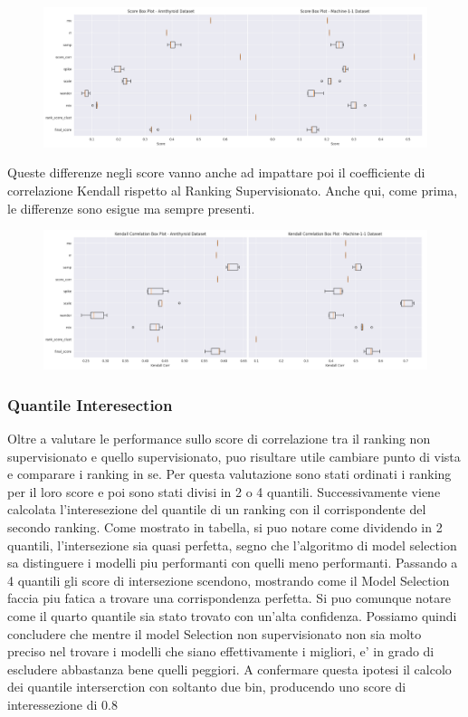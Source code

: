 \begin{figure}[t]
\includegraphics[width=14cm, scale=1]{images/score_box}
\centering
\end{figure}

Queste differenze negli score vanno anche ad impattare poi il coefficiente di correlazione Kendall rispetto al Ranking Supervisionato. Anche qui, come prima, le differenze sono esigue ma sempre presenti.

\begin{figure}[t]
\includegraphics[width=14cm, scale=1]{images/kendall_box}
\centering
\end{figure}


\subsubsection{Quantile Interesection}
Oltre a valutare le performance sullo score di correlazione tra il ranking non supervisionato e quello supervisionato, puo risultare utile cambiare punto di vista e comparare i ranking in se.
Per questa valutazione sono stati ordinati i ranking per il loro score e poi sono stati divisi in 2 o 4 quantili. Successivamente viene calcolata l'interesezione del quantile di un ranking con il corrispondente del secondo ranking.
Come mostrato in tabella, si puo notare come dividendo in 2 quantili, l'intersezione sia quasi perfetta, segno che l'algoritmo di model selection sa distinguere i modelli piu performanti con quelli meno performanti.
Passando a 4 quantili gli score di intersezione scendono, mostrando come il Model Selection faccia piu fatica a trovare una corrispondenza perfetta. Si puo comunque notare come il quarto quantile sia stato trovato con un'alta confidenza.
Possiamo quindi concludere che mentre il model Selection non supervisionato non sia molto preciso nel trovare i modelli che siano effettivamente i migliori, e' in grado di escludere abbastanza bene quelli peggiori. A confermare questa ipotesi il calcolo dei quantile interserction con soltanto due bin, producendo uno score di interessezione di \(0.8\)

